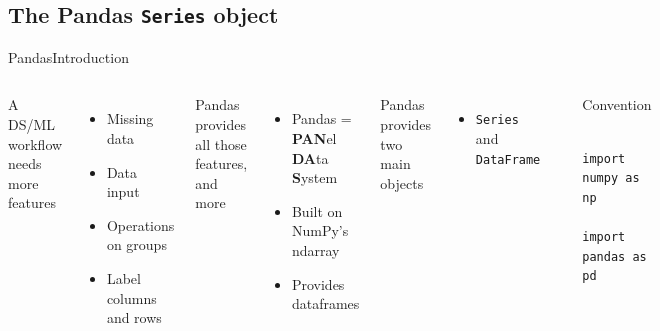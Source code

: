 \documentclass[10pt,compress]{beamer} %
\begin{document}
\subsection{The Pandas \texttt{Series} object}
\begin{frame}[fragile]{Pandas}{Introduction}
	\begin{columns}
		A DS/ML workflow needs more features
		\begin{itemize}
			\item Missing data
			\item Data input
			\item Operations on groups
			\item Label columns and rows
		\end{itemize}
		Pandas provides all those features, and more
		\begin{itemize}
			\item Pandas = \textbf{PAN}el \textbf{DA}ta \textbf{S}ystem
			\item Built on NumPy's ndarray
			\item Provides \alert{dataframes}
		\end{itemize}
		Pandas provides two main objects
		\begin{itemize}
			\item \texttt{Series} and \texttt{DataFrame}
		\end{itemize}

		\includegraphics[width=\textwidth]{figs/pandas.png}	

		\begin{block}{\footnotesize{Convention}}
		\vspace{-0.2cm} 
			\begin{lstlisting}
			import numpy as np
			import pandas as pd
			\end{lstlisting}
		\vspace{-0.2cm} 
		\end{block}

	\end{columns}
\end{frame}
\end{document}
